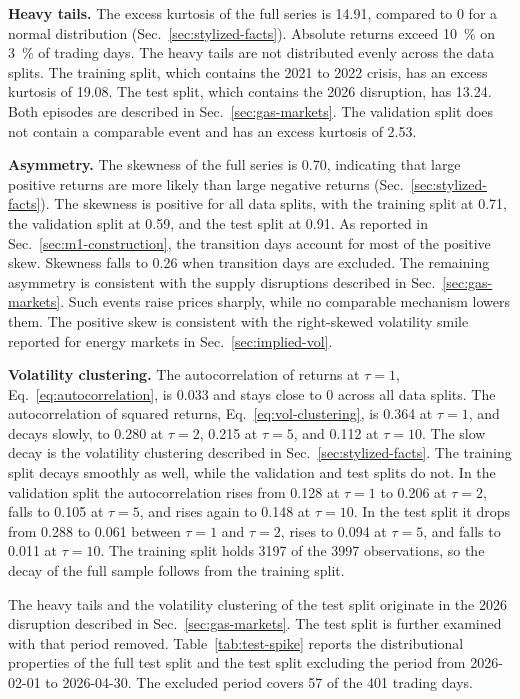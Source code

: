 \textbf{Heavy tails.} The excess kurtosis of the full series is \num{14.91}, compared to 0 for a normal distribution (Sec.~\ref{sec:stylized-facts}). Absolute returns exceed \SI{10}{\percent} on \SI{3}{\percent} of trading days. The heavy tails are not distributed evenly across the data splits. The training split, which contains the 2021 to 2022 crisis, has an excess kurtosis of \num{19.08}. The test split, which contains the 2026 disruption, has \num{13.24}. Both episodes are described in Sec.~\ref{sec:gas-markets}. The validation split does not contain a comparable event and has an excess kurtosis of \num{2.53}.

\textbf{Asymmetry.} The skewness of the full series is \num{0.70}, indicating that large positive returns are more likely than large negative returns (Sec.~\ref{sec:stylized-facts}). The skewness is positive for all data splits, with the training split at \num{0.71}, the validation split at \num{0.59}, and the test split at \num{0.91}. As reported in Sec.~\ref{sec:m1-construction}, the transition days account for most of the positive skew. Skewness falls to \num{0.26}
when transition days are excluded. The remaining asymmetry is consistent with the supply disruptions described in
Sec.~\ref{sec:gas-markets}. Such events raise prices sharply, while no comparable mechanism lowers them. The positive skew is consistent with the right-skewed volatility smile reported for energy markets in Sec.~\ref{sec:implied-vol}.

\textbf{Volatility clustering.} The autocorrelation of returns at $\tau=1$, Eq.~\eqref{eq:autocorrelation}, is \num{0.033} and stays close to 0 across all data splits. The autocorrelation of squared returns, Eq.~\eqref{eq:vol-clustering}, is \num{0.364} at $\tau=1$, and decays slowly, to \num{0.280} at $\tau=2$, \num{0.215} at $\tau=5$, and \num{0.112} at $\tau=10$. The slow decay is the volatility clustering described in Sec.~\ref{sec:stylized-facts}.
The training split decays smoothly as well, while the validation and
test splits do not.
In the validation split the autocorrelation rises from \num{0.128} at $\tau=1$ to \num{0.206} at $\tau=2$, falls to \num{0.105} at $\tau=5$, and rises again to \num{0.148} at $\tau=10$. In the test split it drops from \num{0.288} to \num{0.061} between $\tau=1$ and $\tau=2$, rises to \num{0.094} at $\tau=5$, and falls to \num{0.011} at $\tau=10$. The training split holds \num{3197} of the \num{3997} observations, so the decay of the full sample follows from the training split.

The heavy tails and the volatility clustering of the test split originate in the 2026 disruption described in Sec.~\ref{sec:gas-markets}. The test split is further examined with that period removed. Table~\ref{tab:test-spike} reports the distributional properties of the full test split and the test split excluding the period from 2026-02-01 to 2026-04-30. The excluded period covers \num{57} of the \num{401} trading days.


